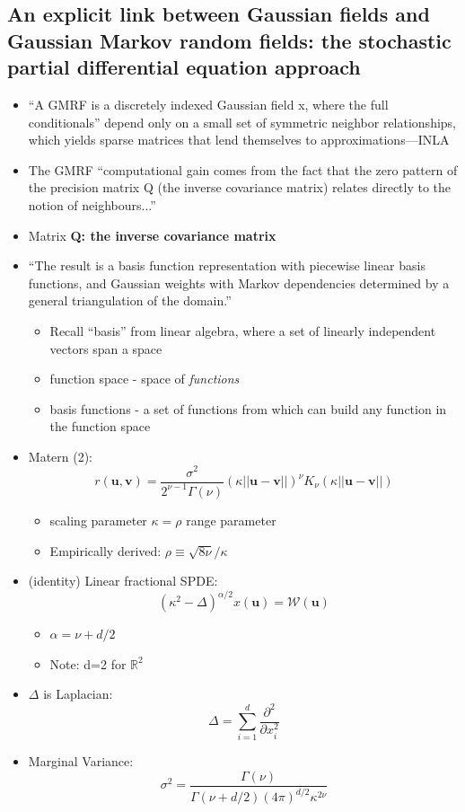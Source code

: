 \documentclass{article}
\begin{document}
\subsection*{An explicit link between Gaussian fields and Gaussian Markov random fields: the stochastic partial differential equation approach \citep{Lindgren2011}}
\begin{itemize}
\item ``A GMRF is a discretely indexed Gaussian field x, where the full conditionals'' depend only on a small set of symmetric neighbor relationships, which yields sparse matrices that lend themselves to approximations---INLA
\item The GMRF ``computational gain comes from the fact that the zero pattern of the precision matrix Q (the inverse covariance matrix) relates directly to the notion of neighbours...''
\item Matrix {\bf Q: the inverse covariance matrix}
\item ``The result is a basis function representation with piecewise linear basis functions, and Gaussian weights with Markov dependencies determined by a general triangulation of the domain.'' 
  \begin{itemize}
  \item Recall ``basis'' from linear algebra, where a set of linearly independent vectors span a space
  \item function space - space of {\it functions}
  \item basis functions - a set of functions from which can build any function in the function space
  \end{itemize}

\item Matern (2):
$$r(\pmb{u}, \pmb{v}) = \frac{\sigma^{2}}{2^{\nu - 1}\Gamma(\nu)}(\kappa||\pmb{u} - \pmb{v}||)^{\nu}K_{\nu}(\kappa||\pmb{u} - \pmb{v}||)$$
      \begin{itemize}
      \item scaling parameter $\kappa = \rho$ range parameter
      \item Empirically derived: $\rho \equiv \sqrt{8\nu}/\kappa$
      \end{itemize}
\item (identity) Linear fractional SPDE:
$$ (\kappa^{2} - \Delta)^{\alpha/2} x(\pmb{u}) = \mathcal{W}(\pmb{u}) $$
      \begin{itemize}
      \item $\alpha = \nu + d/2$ 
      \item Note: d=2 for $\mathbb{R}^{2}$
      \end{itemize}
\item $\Delta$ is Laplacian:
$$ \Delta = \sum_{i=1}^{d} \frac{\partial^{2}}{\partial x_{i}^{2}} $$
\item Marginal Variance:
$$\sigma^{2} = \frac{\Gamma(\nu)}{\Gamma(\nu + d/2)(4\pi)^{d/2}\kappa^{2\nu}}$$
\end{itemize}
\end{document}
